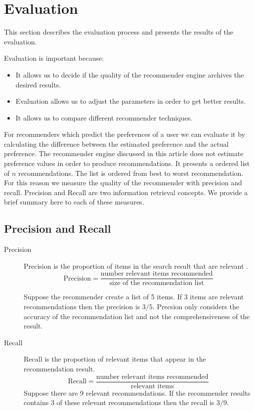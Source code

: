 \section{Evaluation}
\label{sec:evaluation}

This section describes the evaluation process and presents the results of the evaluation.

Evaluation is important because:
\begin{itemize}
  \item It allows us to decide if the quality of the recommender engine archives the desired results.
  \item Evaluation allows us to adjust the parameters in order to get better results.
  \item It allows us to compare different recommender techniques.
\end{itemize}

For recommenders which predict the preferences of a user we can evaluate it by calculating the difference between the estimated preference and the actual preference.
The recommender engine discussed in this article does not estimate preference values in order to produce recommendations. It presents a ordered list of $n$ recommendations. The list is ordered from best to worst recommendation. For this reason we measure the quality of the recommender with precision and recall. Precision and Recall are two information retrieval concepts. We provide a brief summary here to each of these measures.

\subsection{Precision and Recall}
\label{sec:precision}

\begin{description}
\item[Precision] Precision is the proportion of items in the search result that are relevant \cite{Manning}.
  \begin{equation}
    \label{eq:precision}
    \text{Precision} = \frac{\text{number relevant items recommended}}{\text{size of the recommendation list}}
  \end{equation}

 Suppose the recommender create a list of 5 items. If 3 items are relevant recommendations then the precision is $3/5$. 
Precsion only considers the accuracy of the recommendation list and not the comprehensiveness of the result.
\item[Recall] Recall is the proportion of relevant items that appear in the recommendation result. 
  \begin{equation}
    \label{eq:precision}
    \text{Recall} = \frac{\text{number relevant items recommended}}{\text{relevant items}}
  \end{equation}
Suppose there are 9 relevant recommendations. If the recommender results contains 3 of these relevant recommendations then the recall is 3/9.
\end{description}

